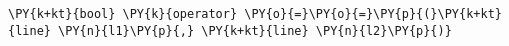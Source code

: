\begin{Verbatim}[commandchars=\\\{\}]
    \PY{k+kt}{bool} \PY{k}{operator} \PY{o}{=}\PY{o}{=}\PY{p}{(}\PY{k+kt}{line} \PY{n}{l1}\PY{p}{,} \PY{k+kt}{line} \PY{n}{l2}\PY{p}{)}
\end{Verbatim}
